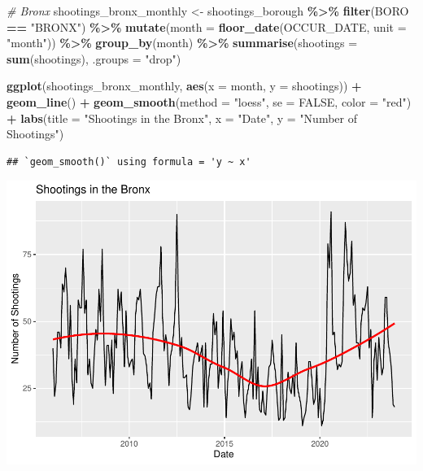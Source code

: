 \documentclass[
]{article}
\newenvironment{Shaded}{\begin{snugshade}}{\end{snugshade}}
\newcommand{\AttributeTok}[1]{\textcolor[rgb]{0.13,0.29,0.53}{#1}}
\newcommand{\CommentTok}[1]{\textcolor[rgb]{0.56,0.35,0.01}{\textit{#1}}}
\newcommand{\ConstantTok}[1]{\textcolor[rgb]{0.56,0.35,0.01}{#1}}
\newcommand{\FunctionTok}[1]{\textcolor[rgb]{0.13,0.29,0.53}{\textbf{#1}}}
\newcommand{\NormalTok}[1]{#1}
\newcommand{\OtherTok}[1]{\textcolor[rgb]{0.56,0.35,0.01}{#1}}
\newcommand{\SpecialCharTok}[1]{\textcolor[rgb]{0.81,0.36,0.00}{\textbf{#1}}}
\newcommand{\StringTok}[1]{\textcolor[rgb]{0.31,0.60,0.02}{#1}}
\begin{document}
\begin{Shaded}
\begin{Highlighting}[]
\CommentTok{\# Bronx}
\NormalTok{shootings\_bronx\_monthly }\OtherTok{\textless{}{-}}\NormalTok{ shootings\_borough }\SpecialCharTok{\%\textgreater{}\%}
  \FunctionTok{filter}\NormalTok{(BORO }\SpecialCharTok{==} \StringTok{"BRONX"}\NormalTok{) }\SpecialCharTok{\%\textgreater{}\%}
  \FunctionTok{mutate}\NormalTok{(}\AttributeTok{month =} \FunctionTok{floor\_date}\NormalTok{(OCCUR\_DATE, }\AttributeTok{unit =} \StringTok{"month"}\NormalTok{)) }\SpecialCharTok{\%\textgreater{}\%}
  \FunctionTok{group\_by}\NormalTok{(month) }\SpecialCharTok{\%\textgreater{}\%}
  \FunctionTok{summarise}\NormalTok{(}\AttributeTok{shootings =} \FunctionTok{sum}\NormalTok{(shootings), }\AttributeTok{.groups =} \StringTok{"drop"}\NormalTok{)}

\FunctionTok{ggplot}\NormalTok{(shootings\_bronx\_monthly, }\FunctionTok{aes}\NormalTok{(}\AttributeTok{x =}\NormalTok{ month, }\AttributeTok{y =}\NormalTok{ shootings)) }\SpecialCharTok{+}
  \FunctionTok{geom\_line}\NormalTok{() }\SpecialCharTok{+}
  \FunctionTok{geom\_smooth}\NormalTok{(}\AttributeTok{method =} \StringTok{"loess"}\NormalTok{, }\AttributeTok{se =} \ConstantTok{FALSE}\NormalTok{, }\AttributeTok{color =} \StringTok{"red"}\NormalTok{) }\SpecialCharTok{+}
  \FunctionTok{labs}\NormalTok{(}\AttributeTok{title =} \StringTok{"Shootings in the Bronx"}\NormalTok{,}
       \AttributeTok{x =} \StringTok{"Date"}\NormalTok{,}
       \AttributeTok{y =} \StringTok{"Number of Shootings"}\NormalTok{)}
\end{Highlighting}
\end{Shaded}

\begin{verbatim}
## `geom_smooth()` using formula = 'y ~ x'
\end{verbatim}

\includegraphics{nypd-shooting-data-analysis_files/figure-latex/trend-shootings-bronx-1.pdf}
\end{document}
